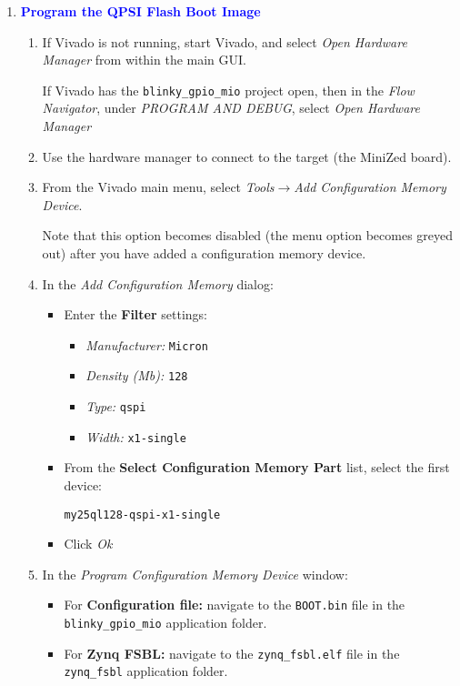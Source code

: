 \begin{enumerate}
\item \textcolor{blue}{\textbf{Program the QPSI Flash Boot Image}}

\begin{enumerate}
\item If Vivado is not running, start Vivado, and select \emph{Open Hardware Manager}
from within the main GUI.

If Vivado has the \verb+blinky_gpio_mio+ project open, then in the \emph{Flow Navigator},
under \emph{PROGRAM AND DEBUG}, select \emph{Open Hardware Manager}

\item Use the hardware manager to connect to the target (the MiniZed board).

\item From the Vivado main menu, select \emph{Tools}$\rightarrow$\emph{Add Configuration Memory Device}.

Note that this option becomes disabled (the menu option becomes greyed out) after you have added a
configuration memory device.

\item In the \emph{Add Configuration Memory} dialog:
\begin{itemize}
\item Enter the \textbf{Filter} settings:
\begin{itemize}
\item \emph{Manufacturer:} \texttt{Micron}
\item \emph{Density (Mb):} \texttt{128}
\item \emph{Type:} \texttt{qspi}
\item \emph{Width:} \texttt{x1-single}
\end{itemize}
%
\item From the \textbf{Select Configuration Memory Part} list, select the first device:

\texttt{my25ql128-qspi-x1-single}
%
\item Click \emph{Ok}
\end{itemize}

\item In the \emph{Program Configuration Memory Device} window:
\begin{itemize}
\item For \textbf{Configuration file:} navigate to the \verb+BOOT.bin+ file in the \verb+blinky_gpio_mio+ application folder.
\item For \textbf{Zynq FSBL:} navigate to the \verb+zynq_fsbl.elf+ file in the \verb+zynq_fsbl+ application folder.


\end{itemize}
\end{enumerate}
\end{enumerate}
